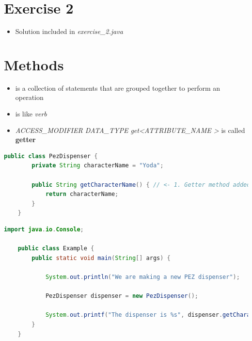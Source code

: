 \documentclass[12pt]{article}
\begin{document}
\bigskip

\section{Exercise 2}

\bigskip

\begin{itemize}
    \item Solution included in \textit{exercise\_2.java}
\end{itemize}

\bigskip

\section{Methods}

\bigskip

\begin{itemize}
    \item is a collection of statements that are grouped together to perform an
    operation
    \item is like \textit{verb}
    \item \textit{ACCESS\_MODIFIER DATA\_TYPE get\textless ATTRIBUTE\_NAME \textgreater}
    is called \textbf{getter}
\end{itemize}

\bigskip

    \begin{lstlisting}[language=Java,caption={lesson\_7/PezDispenser.java}]
    public class PezDispenser {
        private String characterName = "Yoda";

        public String getCharacterName() { // <- 1. Getter method added here
            return characterName;
        }
    }
    \end{lstlisting}

    \bigskip

    \begin{lstlisting}[language=Java,caption={lesson\_7/Example.java}]
    import java.io.Console;

    public class Example {
        public static void main(String[] args) {

            System.out.println("We are making a new PEZ dispenser");

            PezDispenser dispenser = new PezDispenser();

            System.out.printf("The dispenser is %s", dispenser.getCharacterName()); // <- 2. And is used here
        }
    }
    \end{lstlisting}
\end{document}
